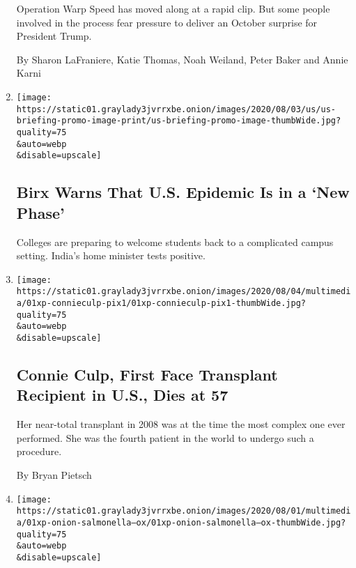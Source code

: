 \begin{enumerate}
  Operation Warp Speed has moved along at a rapid clip. But some people
  involved in the process fear pressure to deliver an October surprise
  for President Trump.

  By Sharon LaFraniere, Katie Thomas, Noah Weiland, Peter Baker and
  Annie Karni
\item
  \href{/2020/08/02/world/coronavirus-covid-19.html}{}

  \texttt{[image: https://static01.graylady3jvrrxbe.onion/images/2020/08/03/us/us-briefing-promo-image-print/us-briefing-promo-image-thumbWide.jpg?quality=75\\\&auto=webp\\\&disable=upscale]}

  \hypertarget{birx-warns-that-us-epidemic-is-in-a-new-phase}{%
  \subsection{Birx Warns That U.S. Epidemic Is in a `New
  Phase'}\label{birx-warns-that-us-epidemic-is-in-a-new-phase}}

  Colleges are preparing to welcome students back to a complicated
  campus setting. India's home minister tests positive.
\item
  \href{/2020/08/01/us/Connie-culp-dead-face-transplant.html}{}

  \texttt{[image: https://static01.graylady3jvrrxbe.onion/images/2020/08/04/multimedia/01xp-connieculp-pix1/01xp-connieculp-pix1-thumbWide.jpg?quality=75\\\&auto=webp\\\&disable=upscale]}

  \hypertarget{connie-culp-first-face-transplant-recipient-in-us-dies-at-57}{%
  \subsection{Connie Culp, First Face Transplant Recipient in U.S., Dies
  at
  57}\label{connie-culp-first-face-transplant-recipient-in-us-dies-at-57}}

  Her near-total transplant in 2008 was at the time the most complex one
  ever performed. She was the fourth patient in the world to undergo
  such a procedure.

  By Bryan Pietsch
\item
  \href{/2020/08/01/us/salmonella-outbreak-onions.html}{}

  \texttt{[image: https://static01.graylady3jvrrxbe.onion/images/2020/08/01/multimedia/01xp-onion-salmonella--ox/01xp-onion-salmonella--ox-thumbWide.jpg?quality=75\\\&auto=webp\\\&disable=upscale]}

  \hypertarget{red-onions-linked-to-salmonella-outbreak-officials-say}{%
}
\end{enumerate}
